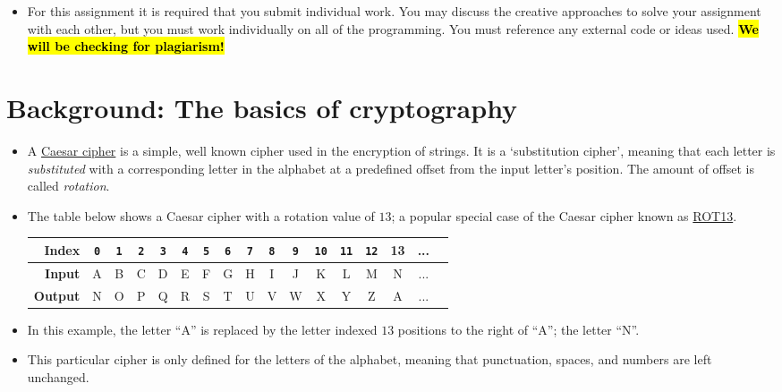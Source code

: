 \documentclass[11pt]{report}
\begin{document}
\begin{itemize}
    \vspace{0.5em}
    {\tt \#\ PART 1.1 Comment here ...}
    \vspace{0.5em}
    
    Note that the order that the answers to the questions appear in the code may be different to the order they appear in this document so it is important to indicate to the marker where you have attempted to answer each question. 
    	\item For this assignment it is required that you submit individual work. You may discuss the creative approaches to solve your assignment with each other, but you must work individually on all of the programming. You must reference any external code or ideas used.
    	\textbf{\hl{We will be checking for plagiarism!}}
    \end{itemize}

\section*{Background: The basics of cryptography}
\begin{itemize}
	\item A \href{https://en.wikipedia.org/wiki/Caesar_cipher}{Caesar cipher} is a simple, well known cipher used in the encryption of strings. It is a `substitution cipher', meaning that each letter is \emph{substituted} with a corresponding letter in the alphabet at a predefined offset from the input letter's position. The amount of offset is called \emph{rotation}.\\
	\item The table below shows a Caesar cipher with a rotation value of $13$; a popular special case of the Caesar cipher known as \href{https://www.wikiwand.com/en/ROT13}{ROT13}.
	\begin{table}[h]
		\centering
		\begin{tabular}{|r|c|c|c|c|c|c|c|c|c|c|c|c|c|c|c|c|}
		\hline
		\textbf{Index} & {\tt 0} & {\tt 1} & {\tt 2} & {\tt 3} & {\tt 4} & {\tt 5} & {\tt 6} & {\tt 7} & {\tt 8} & {\tt 9} & {\tt 10} & {\tt 11} & {\tt 12} & 13 & ... \\ \hline
		\textbf{Input} & A & B & C & D & E & F & G & H & I & J & K  & L  & M & N & ... \\ \hline
		\textbf{Output} & N & O & P & Q & R & S & T & U & V & W & X  & Y  & Z & A & ... \\ \hline
		\end{tabular}
	\end{table}
	\item In this example, the letter ``A'' is replaced by the letter indexed $13$ positions to the right of ``A''; the letter ``N''.
	\item This particular cipher is only defined for the letters of the alphabet, meaning that punctuation, spaces, and numbers are left unchanged.
\end{itemize}
\end{document}
